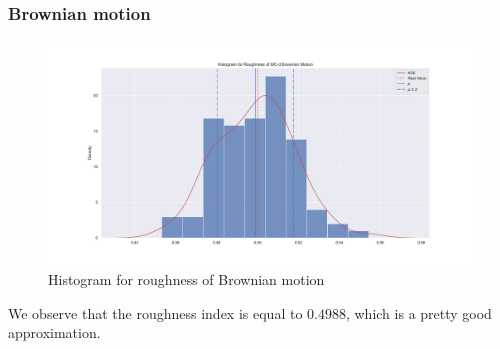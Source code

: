         \subsubsection{Brownian motion}
            \begin{figure}[htbp]
                \centering
                \includegraphics[width=\linewidth]{fig/Histogram for Roughness of MC-d Brownian Motion.pdf}
                \caption{Histogram for roughness of Brownian motion}
            \end{figure}

            We observe that the roughness index is equal to $0.4988$, which is a pretty good approximation.

